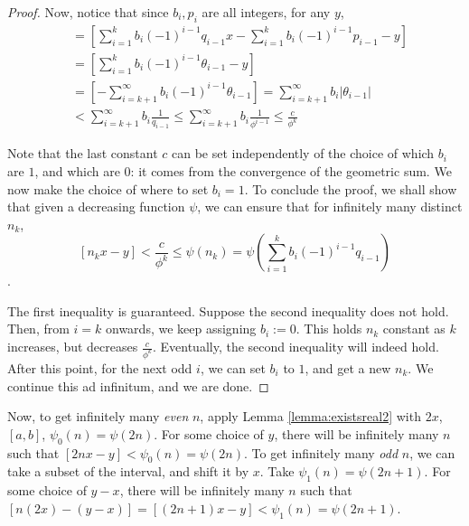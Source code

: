 \begin{proof}
Now, notice that since $b_i, p_i$ are all integers, for any $y$,
\begin{align*}
[n_kx - y] &= \left[\sum_{i=1}^k b_i (-1)^{i-1}q_{i-1}x - \sum_{i=1}^k b_i (-1)^{i-1}p_{i-1} - y\right] \\
&= \left[\sum_{i=1}^k b_i (-1)^{i-1}\theta_{i-1} - y\right] \\
&= \left[- \sum_{i=k+1}^\infty b_i (-1)^{i-1}\theta_{i-1} \right] = \sum_{i=k+1}^\infty b_i |\theta_{i-1} |\\
&< \sum_{i=k+1}^\infty b_i \frac{1}{q_{i-1}} \le \sum_{i=k+1}^\infty b_i \frac{1}{\phi^{i-1}} \le \frac{c}{\phi^k}
\end{align*}

Note that the last constant $c$ can be set independently of the choice of which $b_i$ are $1$, and which are $0$: it comes from the convergence of the geometric sum. We now make the choice of where to set $b_i=1$. To conclude the proof, we shall show that given a decreasing function $\psi$, we can ensure that for infinitely many distinct $n_k$, 
$$[n_k x - y] < \frac{c}{\phi^k} \le \psi(n_k) = \psi\left(\sum_{i=1}^k b_i (-1)^{i-1}q_{i-1}\right)$$.

The first inequality is guaranteed. Suppose the second inequality does not hold. Then, from $i = k$ onwards, we keep assigning $b_i := 0$. This holds $n_k$ constant as $k$ increases, but decreases $\frac{c}{\phi^k}$. Eventually, the second inequality will indeed hold. After this point, for the next odd $i$, we can set $b_i$ to $1$, and get a new $n_k$. We continue this ad infinitum, and we are done.
\end{proof}

Now, to get infinitely many \textit{even} $n$, apply Lemma \ref{lemma:existsreal2} with $2x$, $[a, b]$, $\psi_0(n) = \psi(2n)$. For some choice of $y$, there will be infinitely many $n$ such that $[2nx - y] < \psi_0(n) = \psi(2n)$. To get infinitely many \textit{odd} $n$, we can take a subset of the interval, and shift it by $x$. Take $\psi_1(n) = \psi(2n+1)$. For some choice of $y - x$, there will be infinitely many $n$ such that $[n(2x) - (y-x)] = [(2n+1)x - y] < \psi_1(n) = \psi(2n+1)$.


